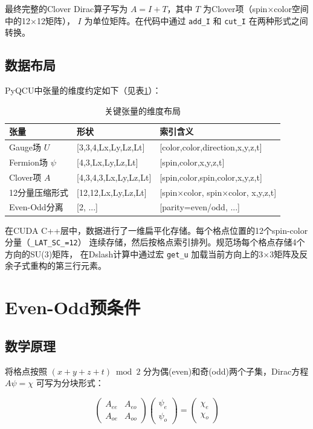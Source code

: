 \documentclass[11pt,a4paper]{article}
\begin{document}
最终完整的Clover Dirac算子写为 $A = I + T$，其中 $T$ 为Clover项（spin×color空间中的12×12矩阵），
$I$ 为单位矩阵。在代码中通过 \texttt{add\_I} 和 \texttt{cut\_I} 在两种形式之间转换。

\subsection{数据布局}

PyQCU中张量的维度约定如下（见表\ref{tab:layout}）：

\begin{table}[h]
\centering
\caption{关键张量的维度布局}
\label{tab:layout}
\begin{tabular}{@{}lll@{}}
\toprule
\textbf{张量} & \textbf{形状} & \textbf{索引含义} \\
\midrule
Gauge场 $U$     & [3,3,4,Lx,Ly,Lz,Lt] & [color,color,direction,x,y,z,t] \\
Fermion场 $\psi$ & [4,3,Lx,Ly,Lz,Lt]   & [spin,color,x,y,z,t] \\
Clover项 $A$   & [4,3,4,3,Lx,Ly,Lz,Lt] & [spin,color,spin,color,x,y,z,t] \\
12分量压缩形式  & [12,12,Lx,Ly,Lz,Lt]  & [spin×color, spin×color, x,y,z,t] \\
Even-Odd分离   & [2, ...]             & [parity=even/odd, ...] \\
\bottomrule
\end{tabular}
\end{table}

在CUDA C++层中，数据进行了一维扁平化存储。每个格点位置的12个spin-color分量（\texttt{\_LAT\_SC\_=12}）
连续存储，然后按格点索引排列。规范场每个格点存储4个方向的SU(3)矩阵，
在Dslash计算中通过宏 \texttt{get\_u} 加载当前方向上的3×3矩阵及反余子式重构的第三行元素。

\section{Even-Odd预条件}

\subsection{数学原理}

将格点按照 $(x+y+z+t) \bmod 2$ 分为偶(even)和奇(odd)两个子集，Dirac方程 $A\psi = \chi$ 可写为分块形式：

\begin{equation}
\begin{pmatrix} A_{ee} & A_{eo} \\ A_{oe} & A_{oo} \end{pmatrix}
\begin{pmatrix} \psi_e \\ \psi_o \end{pmatrix} =
\begin{pmatrix} \chi_e \\ \chi_o \end{pmatrix}
\end{equation}
\end{document}
